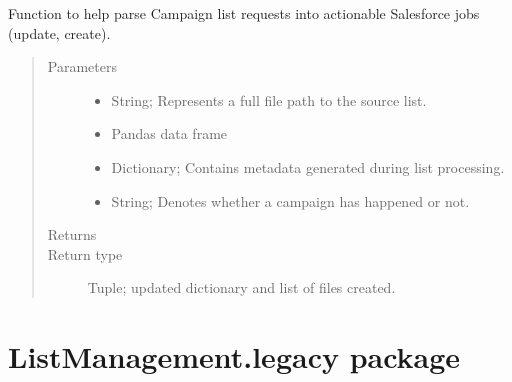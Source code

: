 \documentclass[letterpaper,10pt,english]{sphinxmanual}
\begin{document}
\begin{fulllineitems}
\label{\detokenize{index:ListManagement.sources.campaigns.parse}}
Function to help parse Campaign list requests into
actionable Salesforce jobs (update, create).
\begin{quote}\begin{description}
\item[{Parameters}] \leavevmode\begin{itemize}
\item {} 
 \textendash{} String; Represents a full file path to the source list.

\item {} 
 \textendash{} Pandas data frame

\item {} 
 \textendash{} Dictionary; Contains metadata generated during list processing.

\item {} 
 \textendash{} String; Denotes whether a campaign has happened or not.

\end{itemize}

\item[{Returns}] \leavevmode


\item[{Return type}] \leavevmode
Tuple; updated dictionary and list of files created.

\end{description}\end{quote}

\end{fulllineitems}



\chapter{ListManagement.legacy package}
\label{\detokenize{index:module-ListManagement.legacy}}\label{\detokenize{index:listmanagement-legacy-package}}\label{\detokenize{index:module-ListManagement.legacy.get_sf_adv_list}}
\end{document}
